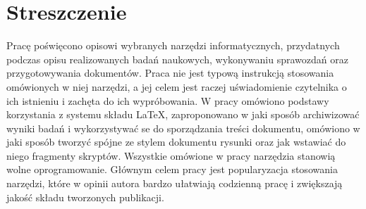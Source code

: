 \chapter*{Streszczenie}

Pracę poświęcono opisowi wybranych narzędzi informatycznych, przydatnych podczas opisu realizowanych badań naukowych, wykonywaniu sprawozdań oraz przygotowywania dokumentów. Praca nie jest typową instrukcją stosowania omówionych w niej narzędzi, a jej celem jest raczej uświadomienie czytelnika o ich istnieniu i zachęta do ich wypróbowania. W pracy omówiono podstawy korzystania z systemu składu \LaTeX{}, zaproponowano w jaki sposób archiwizować wyniki badań i wykorzystywać se do sporządzania treści dokumentu, omówiono w jaki sposób tworzyć spójne ze stylem dokumentu rysunki oraz jak wstawiać do niego fragmenty skryptów. Wszystkie omówione w pracy narzędzia stanowią wolne oprogramowanie. Głównym celem pracy jest popularyzacja stosowania narzędzi, które w opinii autora bardzo ułatwiają codzienną pracę i zwiększają jakość składu tworzonych publikacji.
